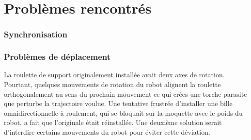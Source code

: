 \section{Problèmes rencontrés}

\subsubsection{Synchronisation}

\subsubsection{Problèmes de déplacement}

La roulette de support originalement installée avait deux axes de
rotation. Pourtant, quelques mouvements de rotation du robot alignent
la roulette orthogonalement au sens du prochain mouvement ce qui crées
une torche parasite que perturbe la trajectoire voulue. Une tentative
frustrée d'installer une bille omnidirectionnelle à roulement, qui se
bloquait sur la moquette avec le poids du robot, a fait que
l'originale était réinstallée. Une deuxième solution serait d'interdire
certains mouvements du robot pour éviter cette déviation.